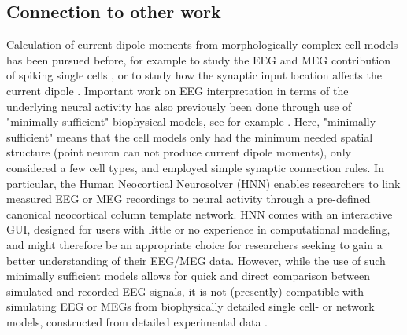 \documentclass[preprint,10pt,authoryear]{elsarticle}
\begin{document}
\subsection{Connection to other work}
Calculation of current dipole moments from morphologically complex cell models has been pursued before, for example to study the EEG and MEG contribution of spiking single cells \citep{Murakami2006}, or to study how the synaptic input location affects the current dipole \citep{LINDEN2010, AHLFORS2015}.
Important work on EEG interpretation in terms of the underlying neural activity has also previously been done through use of "minimally sufficient" biophysical models, see for example \cite{Murakami2002, Murakami2003, Jones2007, Jones2009, Sliva2018, NEYMOTIN2020}. 
Here, "minimally sufficient" means that the cell models only had the minimum needed spatial structure (point neuron can not produce current dipole moments), only considered a few cell types, and employed simple synaptic connection rules.
In particular, the Human Neocortical Neurosolver (HNN) \citep{NEYMOTIN2020} enables researchers to link measured EEG or MEG recordings to neural activity through a pre-defined canonical neocortical column template network. 
HNN comes with an interactive GUI, designed for users with little or no experience in computational modeling, and might therefore be an appropriate choice for researchers seeking to gain a better understanding of their EEG/MEG data.  
However, while the use of such minimally sufficient models allows for quick and direct comparison between simulated and recorded EEG signals, it is not (presently) compatible with simulating EEG or MEGs from biophysically detailed single cell- or network models, constructed from detailed experimental data \citep{Reimann2013, Egger2014, MARKRAM2015, HAGEN2016, Gratiy2018, Arkhipov2018, BILLEH2019}.  
\end{document}
